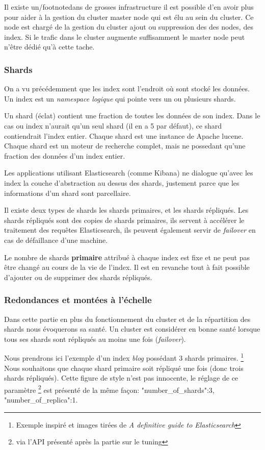 Il existe un/footnote{dans de grosses infrastructure il est possible d'en avoir plus
pour aider à la gestion du cluster} master node qui est élu au sein du cluster. 
Ce node est chargé de la gestion du cluster ajout ou suppression des des nodes, des  
index. Si le trafic dans le cluster augmente suffisamment le master node peut n'être 
dédié qu'à cette tache.

\subsubsection{Shards}
On a vu précédemment que les index sont l'endroit où sont stocké les données. Un 
index est un \textit{namespace logique} qui pointe vers un ou plusieurs shards.

Un shard (éclat) contient une fraction de toutes les données de  son index. Dans 
le cas ou index n'aurait qu'un seul shard (il en a 5 par défaut), ce shard contiendrait
l'index entier.
Chaque shard est une instance de Apache lucene. Chaque shard est un moteur de recherche
complet, mais ne possedant qu'une fraction des données d'un index entier.

Les applications utilisant Elasticsearch (comme Kibana) ne dialogue qu'avec les index
la couche d'abstraction au dessus des shards, justement parce que les informations 
d'un shard sont parcellaire.

Il existe deux types de shards les shards primaires, et les shards répliqués.
Les shards répliqués sont des copies de shards primaires, ils servent à accélérer
le traitement des requêtes Elasticsearch, ils peuvent également servir de \emph{failover} 
en cas de défaillance d'une machine.

Le nombre de shards \textbf{primaire} attribué à chaque index est fixe et ne peut 
pas être changé au cours de la vie de l'index. Il est en revanche tout à fait possible
d'ajouter ou de supprimer des shards répliqués.

\subsubsection{Redondances et montées à l'échelle}
Dans cette partie en plus du fonctionnement du cluster et de la répartition des shards
nous évoquerons sa santé. Un cluster est considérer en bonne santé lorsque tous ses
shards sont répliqués au moins une fois (\textit{failover}).

Nous prendrons ici l'exemple d'un index \emph{blog} possédant 3 shards primaires. 
\footnote{Exemple inspiré et images tirées de \textit{A definitive guide to Elasticsearch}}
Nous souhaitons que chaque shard primaire soit répliqué une fois (donc trois shards
répliqués). Cette figure de style n'est pas innocente, le réglage de ce paramètre
\footnote{via l'API présenté après la partie sur le tuning} est présenté de la même
façon: "number\_of\_shards":3, "number\_of\_replica":1. 


